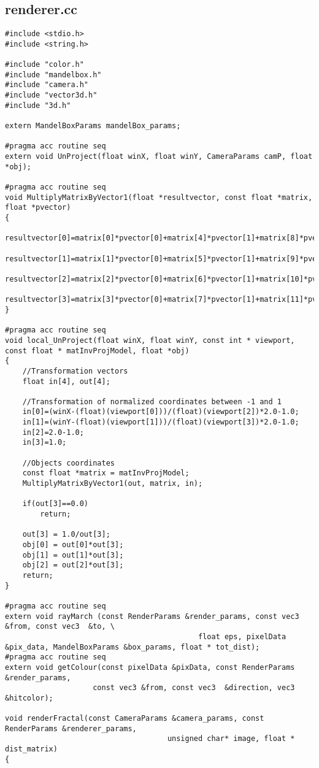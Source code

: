 \documentclass[]{article}
\begin{document}
\subsection*{renderer.cc}\label{subsec:renderer.cc}
\begin{Verbatim}[fontsize= \footnotesize, tabsize=4]
#include <stdio.h>
#include <string.h>

#include "color.h"
#include "mandelbox.h"
#include "camera.h"
#include "vector3d.h"
#include "3d.h"

extern MandelBoxParams mandelBox_params;

#pragma acc routine seq
extern void UnProject(float winX, float winY, CameraParams camP, float *obj);

#pragma acc routine seq
void MultiplyMatrixByVector1(float *resultvector, const float *matrix, float *pvector)
{
	resultvector[0]=matrix[0]*pvector[0]+matrix[4]*pvector[1]+matrix[8]*pvector[2]+matrix[12]*pvector[3];
	resultvector[1]=matrix[1]*pvector[0]+matrix[5]*pvector[1]+matrix[9]*pvector[2]+matrix[13]*pvector[3];
	resultvector[2]=matrix[2]*pvector[0]+matrix[6]*pvector[1]+matrix[10]*pvector[2]+matrix[14]*pvector[3];
	resultvector[3]=matrix[3]*pvector[0]+matrix[7]*pvector[1]+matrix[11]*pvector[2]+matrix[15]*pvector[3];
}

#pragma acc routine seq
void local_UnProject(float winX, float winY, const int * viewport, const float * matInvProjModel, float *obj)
{
	//Transformation vectors
	float in[4], out[4];

	//Transformation of normalized coordinates between -1 and 1
	in[0]=(winX-(float)(viewport[0]))/(float)(viewport[2])*2.0-1.0;
	in[1]=(winY-(float)(viewport[1]))/(float)(viewport[3])*2.0-1.0;
	in[2]=2.0-1.0;
	in[3]=1.0;

	//Objects coordinates
	const float *matrix = matInvProjModel;
	MultiplyMatrixByVector1(out, matrix, in);

	if(out[3]==0.0)
		return;

	out[3] = 1.0/out[3];
	obj[0] = out[0]*out[3];
	obj[1] = out[1]*out[3];
	obj[2] = out[2]*out[3];
	return;
}

#pragma acc routine seq
extern void rayMarch (const RenderParams &render_params, const vec3 &from, const vec3  &to, \
											float eps, pixelData &pix_data, MandelBoxParams &box_params, float * tot_dist);
#pragma acc routine seq
extern void getColour(const pixelData &pixData, const RenderParams &render_params,
					const vec3 &from, const vec3  &direction, vec3 &hitcolor);

void renderFractal(const CameraParams &camera_params, const RenderParams &renderer_params,
									 unsigned char* image, float * dist_matrix)
{


\end{Verbatim}
\end{document}
